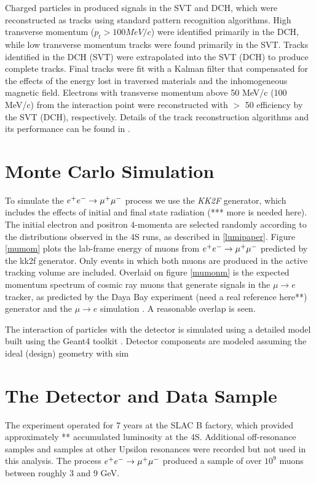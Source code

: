 \documentclass[review]{elsarticle}
\def\eetomm{\ensuremath{ \epem \to \mumu}\xspace}
\def\mutoe{\ensuremath{\mu \to e}\xspace}
\begin{document}
Charged particles in \babar produced signals in the SVT and DCH, which were
reconstructed as tracks using standard pattern recognition algorithms.  High
transverse momentum ($p_t > 100 MeV/c$) were identified primarily in the DCH,
while low transverse momentum tracks were found primarily in the SVT.  Tracks
identified in the DCH (SVT) were extrapolated into the SVT (DCH) to produce
complete tracks.  Final tracks were fit with a Kalman filter that compensated
for the effects of the energy lost in traversed materials and the inhomogeneous
\babar magnetic field.  Electrons with transverse momentum above 50 MeV/c (100
MeV/c) from the \epem interaction point were reconstructed with $>$ 50%
efficiency by the SVT (DCH), respectively.  Details of the \babar track
reconstruction algorithms and its performance can be found in \cite{babarnim2}.

\section{Monte Carlo Simulation}

To simulate the \eetomm process we use the {\em KK2F} \cite{kk2f} generator, which
includes the effects of initial and final state radiation (*** more is needed
here).  The initial electron and positron 4-momenta are selected randomly
according to the distributions observed in the \babar \Y4S runs, as described
in \ref{lumipaper}.  Figure \ref{mumom} plots the lab-frame energy of muons
from  \eetomm predicted by the kk2f generator.  Only events in which both muons
are produced in the active tracking volume are included.  Overlaid on figure
\ref{mumonm} is the expected momentum spectrum of cosmic ray muons that
generate signals in the \mutoe tracker, as predicted
by the Daya Bay experiment (need a real reference here**)
\cite{dayabay} generator and the \mutoe simulation \cite{mutoe}.  A reasonable
overlap is seen.

The interaction of particles with the \babar detector is simulated using a
detailed model built using the Geant4 toolkit \cite{g4}.  Detector components
are modeled assuming the ideal (design) geometry with sim\section{The \babar
Detector and Data Sample}

The \babar experiment operated for 7 years at the SLAC B factory, which
provided approximately ** accumulated luminosity at the \Y4S.  Additional
off-resonance samples and samples at other Upsilon resonances were recorded but
not used in this analysis.  The process \eetomm produced a sample of over
$10^9$ muons between roughly 3 and 9 GeV.
\end{document}
